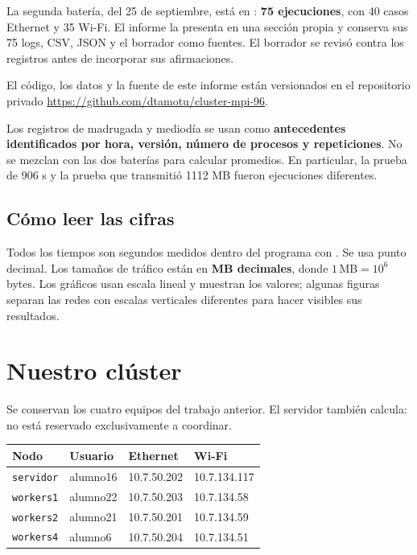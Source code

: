 La segunda batería, del 25 de septiembre, está en : \textbf{75 ejecuciones}, con 40 casos Ethernet y 35 Wi-Fi. El informe la presenta en una sección propia y conserva sus 75 logs, CSV, JSON y el borrador  como fuentes. El borrador se revisó contra los registros antes de incorporar sus afirmaciones.

El código, los datos y la fuente de este informe están versionados en el repositorio privado \url{https://github.com/dtamotu/cluster-mpi-96}.

Los registros de madrugada y mediodía se usan como \textbf{antecedentes identificados por hora, versión, número de procesos y repeticiones}. No se mezclan con las dos baterías para calcular promedios. En particular, la prueba de 906 s y la prueba que transmitió 1112 MB fueron ejecuciones diferentes.

\subsection{Cómo leer las cifras}
Todos los tiempos son segundos medidos dentro del programa con . Se usa punto decimal. Los tamaños de tráfico están en \textbf{MB decimales}, donde $1\,\mathrm{MB}=10^6$ bytes. Los gráficos usan escala lineal y muestran los valores; algunas figuras separan las redes con escalas verticales diferentes para hacer visibles sus resultados.

\section{Nuestro clúster}

Se conservan los cuatro equipos del trabajo anterior. El servidor también calcula: no está reservado exclusivamente a coordinar.

\begin{center}\small
\begin{tabular}{llll}
\toprule
Nodo & Usuario & Ethernet & Wi-Fi \\
\midrule
\texttt{servidor} & alumno16 & 10.7.50.202 & 10.7.134.117 \\
\texttt{workers1} & alumno22 & 10.7.50.203 & 10.7.134.58 \\
\texttt{workers2} & alumno21 & 10.7.50.201 & 10.7.134.59 \\
\texttt{workers4} & alumno6 & 10.7.50.204 & 10.7.134.51 \\
\bottomrule
\end{tabular}\end{center}

